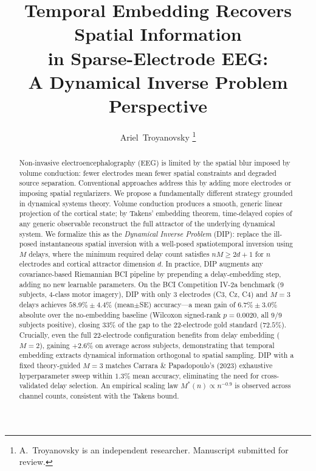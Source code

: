 \documentclass[journal]{IEEEtran}
\begin{document}
\title{Temporal Embedding Recovers Spatial Information\\in Sparse-Electrode EEG:\\A Dynamical Inverse Problem Perspective}

\author{Ariel~Troyanovsky%
\thanks{A.~Troyanovsky is an independent researcher. Manuscript submitted for review.}}

\maketitle

\begin{abstract}
Non-invasive electroencephalography (EEG) is limited by the spatial blur imposed by volume conduction: fewer electrodes mean fewer spatial constraints and degraded source separation. Conventional approaches address this by adding more electrodes or imposing spatial regularizers. We propose a fundamentally different strategy grounded in dynamical systems theory. Volume conduction produces a smooth, generic linear projection of the cortical state; by Takens' embedding theorem, time-delayed copies of any generic observable reconstruct the full attractor of the underlying dynamical system. We formalize this as the \emph{Dynamical Inverse Problem} (DIP): replace the ill-posed instantaneous spatial inversion with a well-posed spatiotemporal inversion using $M$ delays, where the minimum required delay count satisfies $nM \geq 2d+1$ for $n$ electrodes and cortical attractor dimension $d$. In practice, DIP augments any covariance-based Riemannian BCI pipeline by prepending a delay-embedding step, adding no new learnable parameters. On the BCI Competition IV-2a benchmark (9 subjects, 4-class motor imagery), DIP with only 3 electrodes (C3, Cz, C4) and $M=3$ delays achieves $58.9\%\pm4.4\%$ (mean$\pm$SE) accuracy---a mean gain of $6.7\%\pm3.0\%$ absolute over the no-embedding baseline (Wilcoxon signed-rank $p=0.0020$, all 9/9 subjects positive), closing 33\% of the gap to the 22-electrode gold standard ($72.5\%$). Crucially, even the full 22-electrode configuration benefits from delay embedding ($M=2$), gaining $+2.6\%$ on average across subjects, demonstrating that temporal embedding extracts dynamical information orthogonal to spatial sampling. DIP with a fixed theory-guided $M=3$ matches Carrara \& Papadopoulo's (2023) exhaustive hyperparameter sweep within $1.3\%$ mean accuracy, eliminating the need for cross-validated delay selection. An empirical scaling law $M^*(n) \propto n^{-0.9}$ is observed across channel counts, consistent with the Takens bound.
\end{abstract}
\end{document}
